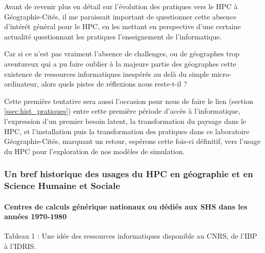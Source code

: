 Avant de revenir plus en détail sur l'évolution des pratiques vers le HPC à Géographie-Cités, il me paraissait important de questionner cette absence d'intérét général pour le HPC, en les mettant en perspective d'une certaine actualité questionnant les pratiques l'enseignement de l'informatique.

Car si ce n'est pas vraiment l'absence de challenges, ou de géographes trop aventureux qui a pu faire oublier à la majeure partie des géographes cette existence de ressources informatiques inespérés au delà du simple micro-ordinateur, alors quels pistes de réflexions nous reste-t-il  ?

Cette première tentative sera aussi l'occasion pour nous de faire le lien (section \ref{ssec:hist_pratiques}) entre cette première période d'accès à l'informatique, l'expression d'un premier besoin latent, la transformation du paysage dans le HPC, et l'installation puis la transformation des pratiques dans ce laboratoire Géographie-Cités, marquant un retour, espérons cette fois-ci définitif, vers l'usage du HPC pour l'exploration de nos modèles de simulation.

\subsubsection{Un bref historique des usages du HPC en géographie et en Science Humaine et Sociale}
\label{sssec:histo_centrecalcul}


\paragraph{Centres de calculs générique nationaux ou dédiés aux SHS dans les années 1970-1980}


Tableau 1 : Une idée des ressources informatiques disponible au CNRS, de l'IBP à l'IDRIS.

